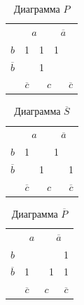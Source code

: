 \documentclass[a4paper,14pt]{article}
\begin{document}
\begin{table}[H]
	\begin{center}
		\caption{\label{tab:tab3} Диаграмма $P$}
		\begin{tabular}{ccccc}
			& \multicolumn{2}{c}{$a$}                           & \multicolumn{2}{c}{$\overline{a}$}                          \\ \cline{2-5} 
			\multicolumn{1}{c|}{$b$}  & \multicolumn{1}{c|}{1}  & \multicolumn{1}{c|}{1} & \multicolumn{1}{c|}{1}  & \multicolumn{1}{c|}{} \\ \cline{2-5} 
			\multicolumn{1}{c|}{$\overline{b}$} & \multicolumn{1}{c|}{} & \multicolumn{1}{c|}{1}  & \multicolumn{1}{c|}{} & \multicolumn{1}{c|}{}  \\ \cline{2-5} 
			& $\overline{c}$                     & \multicolumn{2}{c}{$c$}                          & $\overline{c}$                     
		\end{tabular}
	\end{center}
\end{table}

\begin{table}[H]
	\begin{center}
		\caption{\label{tab:tab4} Диаграмма $\overline{S}$}
		\begin{tabular}{ccccc}
			& \multicolumn{2}{c}{$a$}                           & \multicolumn{2}{c}{$\overline{a}$}                          \\ \cline{2-5} 
			\multicolumn{1}{c|}{$b$}  & \multicolumn{1}{c|}{1}  & \multicolumn{1}{c|}{} & \multicolumn{1}{c|}{1}  & \multicolumn{1}{c|}{} \\ \cline{2-5} 
			\multicolumn{1}{c|}{$\overline{b}$} & \multicolumn{1}{c|}{} & \multicolumn{1}{c|}{1}  & \multicolumn{1}{c|}{} & \multicolumn{1}{c|}{1}  \\ \cline{2-5} 
			& $\overline{c}$                     & \multicolumn{2}{c}{$c$}                          & $\overline{c}$                     
		\end{tabular}
	\end{center}
\end{table}

\begin{table}[H]
	\begin{center}
		\caption{\label{tab:tab5} Диаграмма $\overline{P}$}
		\begin{tabular}{ccccc}
			& \multicolumn{2}{c}{$a$}                           & \multicolumn{2}{c}{$\overline{a}$}                          \\ \cline{2-5} 
			\multicolumn{1}{c|}{$b$}  & \multicolumn{1}{c|}{}  & \multicolumn{1}{c|}{} & \multicolumn{1}{c|}{}  & \multicolumn{1}{c|}{1} \\ \cline{2-5} 
			\multicolumn{1}{c|}{$\overline{b}$} & \multicolumn{1}{c|}{1} & \multicolumn{1}{c|}{}  & \multicolumn{1}{c|}{1} & \multicolumn{1}{c|}{1}  \\ \cline{2-5} 
			& $\overline{c}$                     & \multicolumn{2}{c}{$c$}                          & $\overline{c}$                     
		\end{tabular}
	\end{center}
\end{table}
\end{document}
